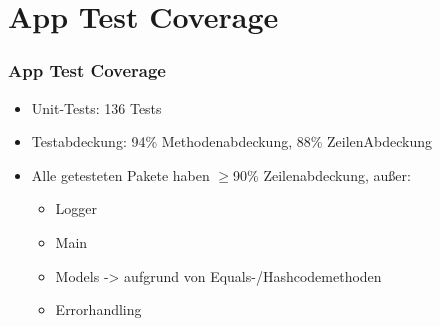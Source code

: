 \section*{App Test Coverage}

\begin{frame}\frametitle{App Test Coverage}
    \begin{itemize}
        \item Unit-Tests: 136 Tests
        \item Testabdeckung: 94\% Methodenabdeckung, 88\% ZeilenAbdeckung
        \item Alle getesteten Pakete haben $\geq$90\% Zeilenabdeckung, außer: 
        \begin{itemize}
            \item Logger
            \item Main
            \item Models -> aufgrund von Equals-/Hashcodemethoden 
            \item Errorhandling
        \end{itemize}
        \end{itemize}
\end{frame}